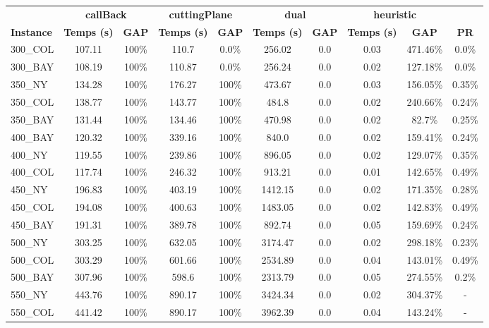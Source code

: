 \documentclass[main.tex]{subfiles}
\begin{document}
\begin{center}
\renewcommand{\arraystretch}{1.4} 
\begin{tabular}{lccccccccc}
	\hline
 & \multicolumn{2}{c}{\textbf{callBack}} & \multicolumn{2}{c}{\textbf{cuttingPlane}} & \multicolumn{2}{c}{\textbf{dual}} & \multicolumn{2}{c}{\textbf{heuristic}}\\
\textbf{Instance}  & \textbf{Temps (s)} & \textbf{GAP} & \textbf{Temps (s)} & \textbf{GAP} & \textbf{Temps (s)} & \textbf{GAP} & \textbf{Temps (s)} & \textbf{GAP} & \textbf{PR} \\\hline

300\_COL & 107.11 &  100\%  & 110.7 & 0.0\% & 256.02 & 0.0 & 0.03 & 471.46\% & 0.0\%\\
300\_BAY & 108.19 &  100\%  & 110.87 & 0.0\% & 256.24 & 0.0 & 0.02 & 127.18\% & 0.0\%\\
350\_NY & 134.28 &  100\%  & 176.27 &  100\%  & 473.67 & 0.0 & 0.03 & 156.05\% & 0.35\%\\
350\_COL & 138.77 &  100\%  & 143.77 &  100\%  & 484.8 & 0.0 & 0.02 & 240.66\% & 0.24\%\\
350\_BAY & 131.44 &  100\%  & 134.46 &  100\%  & 470.98 & 0.0 & 0.02 & 82.7\% & 0.25\%\\
400\_BAY & 120.32 &  100\%  & 339.16 &  100\%  & 840.0 & 0.0 & 0.02 & 159.41\% & 0.24\%\\
400\_NY & 119.55 &  100\%  & 239.86 &  100\%  & 896.05 & 0.0 & 0.02 & 129.07\% & 0.35\%\\
400\_COL & 117.74 &  100\%  & 246.32 &  100\%  & 913.21 & 0.0 & 0.01 & 142.65\% & 0.49\%\\
450\_NY & 196.83 &  100\%  & 403.19 &  100\%  & 1412.15 & 0.0 & 0.02 & 171.35\% & 0.28\%\\
450\_COL & 194.08 &  100\%  & 400.63 &  100\%  & 1483.05 & 0.0 & 0.02 & 142.83\% & 0.49\%\\
450\_BAY & 191.31 &  100\%  & 389.78 &  100\%  & 892.74 & 0.0 & 0.05 & 159.69\% & 0.24\%\\
500\_NY & 303.25 &  100\%  & 632.05 &  100\%  & 3174.47 & 0.0 & 0.02 & 298.18\% & 0.23\%\\
500\_COL & 303.29 &  100\%  & 601.66 &  100\%  & 2534.89 & 0.0 & 0.04 & 143.01\% & 0.49\%\\
500\_BAY & 307.96 &  100\%  & 598.6 &  100\%  & 2313.79 & 0.0 & 0.05 & 274.55\% & 0.2\%\\
550\_NY & 443.76 &  100\%  & 890.17 &  100\%  & 3424.34 & 0.0 & 0.02 & 304.37\% & - \\
550\_COL & 441.42 &  100\%  & 890.17 &  100\%  & 3962.39 & 0.0 & 0.04 & 143.24\% & - \\

\end{tabular}
\end{center}
\end{document}
